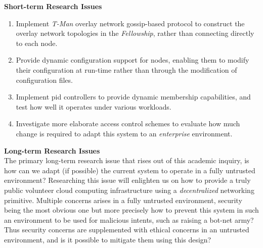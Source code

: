 \documentclass[12pt, titlepage]{uo_temp}
\begin{document}
     \textbf{Short-term Research Issues}\\
     \begin{enumerate}
     \item Implement \emph{T-Man} overlay network gossip-based protocol to construct the
       overlay network topologies in the \emph{Fellowship}, rather than connecting
       directly to each node.
     \item Provide dynamic configuration support for nodes, enabling them to modify their
       configuration at run-time rather than through the modification of configuration
       files.
     \item Implement \gls{pid} controllers to provide dynamic membership capabilities, and
       test how well it operates under various workloads.
     \item Investigate more elaborate access control schemes to evaluate how much change
       is required to adapt this system to an \emph{enterprise} environment.
     \end{enumerate}

     \textbf{Long-term Research Issues}\\
     The primary long-term research issue that rises out of this academic inquiry, is how
     can we adapt (if possible) the current system to operate in a fully untrusted
     environment? Researching this issue will enlighten us on how to provide a truly
     public volunteer cloud computing infrastructure using a \emph{decentralized}
     networking primitive. Multiple concerns arises in a fully untrusted environment,
     security being the most obvious one but more precisely how to prevent this system in
     such an environment to be used for malicious intents, such as raising a bot-net army?
     Thus security concerns are supplemented with ethical concerns in an untrusted
     environment, and is it possible to mitigate them using this design?
\end{document}
